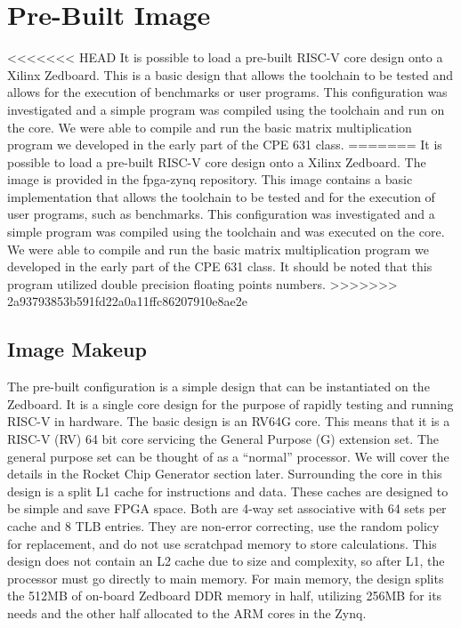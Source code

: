 \documentclass[journal]{IEEEtran}
\begin{document}
\section{Pre-Built Image}
<<<<<<< HEAD
It is possible to load a pre-built RISC-V core design onto a Xilinx Zedboard. This is a basic design that allows the toolchain to be tested and allows for the execution of benchmarks or user programs. This configuration was investigated and a simple program was compiled using the toolchain and run on the core. We were able to compile and run the basic matrix multiplication program we developed in the early part of the CPE 631 class.
=======
It is possible to load a pre-built RISC-V core design onto a Xilinx Zedboard. The image is provided in the fpga-zynq repository. This image contains a basic implementation that allows the toolchain to be tested and for the execution of user programs, such as benchmarks. This configuration was investigated and a simple program was compiled using the toolchain and was executed on the core. We were able to compile and run the basic matrix multiplication program we developed in the early part of the CPE 631 class. It should be noted that this program utilized double precision floating points numbers.
>>>>>>> 2a93793853b591fd22a0a11ffc86207910e8ae2e

\subsection{Image Makeup}
The pre-built configuration is a simple design that can be instantiated on the Zedboard. It is a single core design for the purpose of rapidly testing and running RISC-V in hardware. The basic design is an RV64G core. This means that it is a RISC-V (RV) 64 bit core servicing the General Purpose (G) extension set. The general purpose set can be thought of as a ``normal'' processor. We will cover the details in the Rocket Chip Generator section later. \newline
Surrounding the core in this design is a split L1 cache for instructions and data. These caches are designed to be simple and save FPGA space. Both are 4-way set associative with 64 sets per cache and 8 TLB entries. They are non-error correcting, use the random policy for replacement, and do not use scratchpad memory to store calculations. \newline
This design does not contain an L2 cache due to size and complexity, so after L1, the processor must go directly to main memory. For main memory, the design splits the 512MB of on-board Zedboard DDR memory in half, utilizing 256MB for its needs and the other half allocated to the ARM cores in the Zynq.
\end{document}
